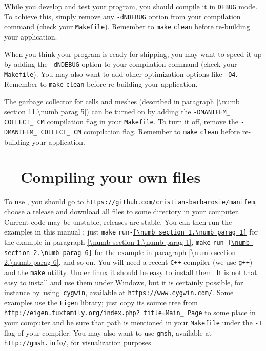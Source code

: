 While you develop and test your program, you should compile it in {\small\tt DEBUG} mode.
To achieve this, simply remove any {\small\tt -dNDEBUG} option from your compilation
command (check your {\small\tt Makefile}).
Remember to {\small\tt make} {\small\tt clean} before re-building your application.

When you think your program is ready for shipping, you may want to speed it up
by adding the {\small\tt -dNDEBUG} option to your compilation command
(check your {\small\tt Makefile}).
You may also want to add other optimization options like {\small\tt -O4}.
Remember to {\small\tt make} {\small\tt clean} before re-building your application.

The garbage collector for cells and meshes (described in paragraph
\ref{\numb section 11.\numb parag 5}) can be turned on by adding the
{\small\tt -DMANIFEM\_\,COLLECT\_\,CM} compilation flag in your {\small\tt Makefile}.
To turn it off, remove the {\small\tt -DMANIFEM\_\,COLLECT\_\,CM} compilation flag.
Remember to {\small\tt make} {\small\tt clean} before re-building your application.


\section{~~Compiling your own files}\label{\numb section 11.\numb parag 16}

To use \maniFEM, you should go to {\small\tt https://github.com/cristian-barbarosie/manifem},
choose a release and download all files to some directory in your computer.
Current code may be unstable, releases are stable.
You can then run the examples in this manual :
just {\small\tt make} {\small\tt run-\ref{\numb section 1.\numb parag 1}}
for the example in paragraph \ref{\numb section 1.\numb parag 1},
{\small\tt make} {\small\tt run-\ref{\numb section 2.\numb parag 6}}
for the example in paragraph \ref{\numb section 2.\numb parag 6}, and so on.
You will need a recent {\tt C++} compiler (we use {\small\tt g++}) and the {\small\tt make} utility.
Under linux it should be easy to install them.
It is not that easy to install and use them under Windows, but it is certainly possible,
for instance \hbox{by using {\small\tt cygwin}},
available at {\small\tt https://www.cygwin.com/}.
Some examples use the {\small\tt Eigen} library; just copy its source tree
from {\small\tt http://eigen.tuxfamily.org/index.php? title=Main\_\,Page}
to some place in your computer and be sure that
path is mentioned in your {\small\tt Makefile}
under the {\small\tt -I} flag of your compiler.
You may also want to use {\tt gmsh}, available at {\small\tt http://gmsh.info/},
for visualization purposes.


